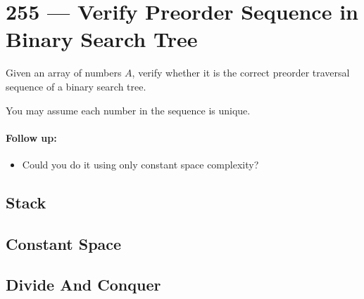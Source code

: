 \section{255 --- Verify Preorder Sequence in Binary Search Tree}
Given an array of numbers $A$, verify whether it is the correct preorder traversal sequence of a binary search tree.
\par
You may assume each number in the sequence is unique.
\paragraph{Follow up:}
\begin{itemize}
\item Could you do it using only constant space complexity?
\end{itemize}
\subsection{Stack}
\subsection{Constant Space}
\subsection{Divide And Conquer}